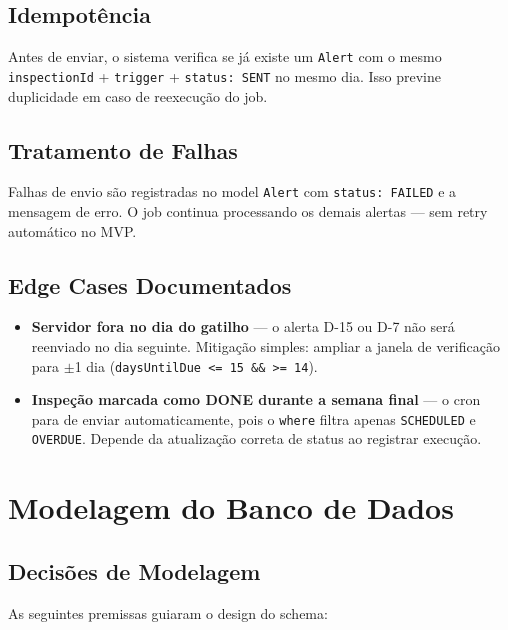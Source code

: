 \documentclass[12pt, a4paper]{article}
\begin{document}
\subsection{Idempotência}

Antes de enviar, o sistema verifica se já existe um \texttt{Alert} com o mesmo
\texttt{inspectionId} + \texttt{trigger} + \texttt{status: SENT} no mesmo dia.
Isso previne duplicidade em caso de reexecução do job.

\subsection{Tratamento de Falhas}

Falhas de envio são registradas no model \texttt{Alert} com \texttt{status: FAILED}
e a mensagem de erro. O job continua processando os demais alertas — sem retry
automático no MVP.

\subsection{Edge Cases Documentados}

\begin{itemize}[leftmargin=1.5em]
    \item \textbf{Servidor fora no dia do gatilho} — o alerta D-15 ou D-7 não será
    reenviado no dia seguinte. Mitigação simples: ampliar a janela de verificação
    para $\pm$1 dia (\texttt{daysUntilDue <= 15 \&\& >= 14}).
    \item \textbf{Inspeção marcada como DONE durante a semana final} — o cron para
    de enviar automaticamente, pois o \texttt{where} filtra apenas \texttt{SCHEDULED}
    e \texttt{OVERDUE}. Depende da atualização correta de status ao registrar execução.
\end{itemize}

\vspace{0.5cm}

\section{Modelagem do Banco de Dados}
\label{sec:modelagem}

\subsection{Decisões de Modelagem}

As seguintes premissas guiaram o design do schema:
\end{document}
